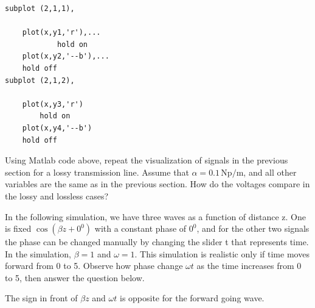 \documentclass{ximera}
\begin{document}
\begin{example}
\begin{explanation}
\begin{verbatim}
subplot (2,1,1),

    plot(x,y1,'r'),...
            hold on
    plot(x,y2,'--b'),...
    hold off
subplot (2,1,2),

    plot(x,y3,'r')
        hold on
    plot(x,y4,'--b')
    hold off
\end{verbatim}

Using Matlab code above, repeat the visualization of signals in the previous section for a lossy transmission line. Assume that $\alpha=0.1\,\mathrm{Np}/\mathrm{m}$, and all other variables are the same as in the previous section. How do the voltages compare in the lossy and lossless cases?
\end{explanation}
\end{example}



\begin{question}
In the following simulation, we have three waves as a function of distance z. One is fixed $\cos (\beta z +0^0)$ with a constant phase of $0^0$, and for the other two signals the phase can be changed manually by changing the slider t that represents time. In the simulation, $\beta=1$ and $\omega=1$. This simulation is realistic only if time moves forward from 0 to 5.  Observe how phase change $\omega t$ as the time increases from 0 to 5, then answer the question below. 

\begin{center}  
\end{center} 
The sign in front of $ \beta z $ and $\omega t$ is opposite for the forward going wave.
\begin{multipleChoice}  
\end{multipleChoice}  


\end{question}
\end{document}
